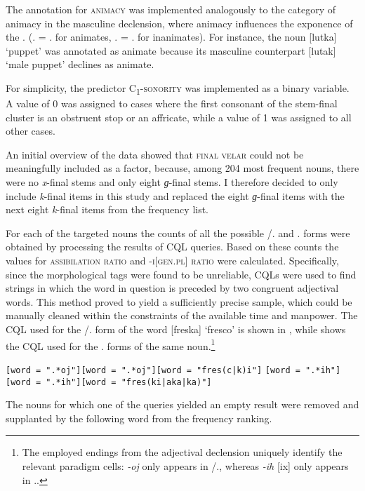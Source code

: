 \documentclass[output=paper,colorlinks,citecolor=brown]{langscibook}
\begin{document}
The annotation for \textsc{animacy} was implemented analogously to the category of animacy in the masculine declension, where animacy influences the exponence of the {\ACC.\SG} ({\ACC.\SG} = {\GEN.\SG} for animates, {\ACC.\SG} = {\NOM.\SG} for inanimates). For instance, the noun [{lutka}] `puppet' was annotated as animate because its masculine counterpart [{lutak}] `male puppet' declines as animate. 

For simplicity, the predictor \textsc{C\textsubscript{1}-sonority} was implemented as a binary variable. A value of \textsf{0} was assigned to cases where the first consonant of the stem-final cluster is an obstruent stop or an affricate, while a value of \textsf{1} was assigned to all other cases. 

An initial overview of the data showed that \textsc{final velar} could not be meaningfully included as a factor, because, among 204 most frequent nouns, there were no \textit{x}-final stems and only eight \textit{ɡ}-final stems. I therefore decided to only include \textit{k}-final items in this study and replaced the eight \textit{ɡ}-final items with the next eight \textit{k}-final items from the frequency list.

For each of the targeted nouns the counts of all the possible {\DAT/\LOC.\SG} and {\GEN.\PL} forms were obtained by processing the results of CQL queries. Based on these counts the values for \textsc{assibilation ratio} and \textsc{\nobreakdash-i[gen.pl] ratio} were calculated. Specifically, since the morphological tags were found to be unreliable, CQLs were used to find strings in which the word in question is preceded by two congruent adjectival words. This method proved to yield a sufficiently precise sample, which could be manually cleaned within the constraints of the available time and manpower. The CQL used for the {\DAT/\LOC.\SG} form of the word [{freska}] `fresco' is shown in , while  shows the CQL used for the {\GEN.\PL} forms of the same noun.\footnote{The employed endings from the adjectival declension uniquely identify the relevant paradigm cells: \textit{-oj} only appears in {\DAT/\LOC.\SG}, whereas \textit{-ih} [{ix}] only appears in {\GEN.\PL}.}

\ea \ea \texttt{[word = ".*oj"][word = ".*oj"][word = "fres(c|k)i"]} \label{sim:ex:cql1:datloc}
\ex \texttt{[word = ".*ih"][word = ".*ih"][word = "fres(ki|aka|ka)"]} \label{sim:ex:cql1:genpl}
\z\z

\noindent The nouns for which one of the queries yielded an empty result were removed and supplanted by the following word from the frequency ranking.
\end{document}
